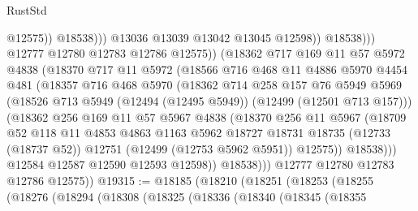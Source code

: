 \begin{lexlean}{RustStd}
\begin{coremodule}
{\begin{coremodule}
{{{{{{{{{{{{{{{{{{{{{{{{{{{{{{{{{{{{{{{{{{{{{{{{{{{{{{{{{{{{{{{{{{{{{{{{{{{{{{{{                                    @12575))
                                @18538)))
                          @13036
                          @13039
                          @13042
                          @13045
                          @12598))
                      @18538)))
                @12777
                @12780
                @12783
                @12786
                @12575))
            (@18362
              @717
              @169
              @11
              @57
              @5972
              @4838
              (@18370
                @717
                @11
                @5972
                (@18566
                  @716
                  @468
                  @11
                  @4886
                  @5970
                  @4454
                  @481
                  (@18357
                    @716
                    @468
                    @5970
                    (@18362
                      @714
                      @258
                      @157
                      @76
                      @5949
                      @5969
                      (@18526 @713 @5949 (@12494 (@12495 @5949)) (@12499 (@12501 @713 @157)))
                      (@18362
                        @256
                        @169
                        @11
                        @57
                        @5967
                        @4838
                        (@18370
                          @256
                          @11
                          @5967
                          (@18709
                            @52
                            @118
                            @11
                            @4853
                            @4863
                            @1163
                            @5962
                            @18727
                            @18731
                            @18735
                            (@12733 (@18737 @52))
                            @12751
                            (@12499 (@12753 @5962 @5951))
                            @12575))
                        @18538)))
                  @12584
                  @12587
                  @12590
                  @12593
                  @12598))
              @18538)))
        @12777
        @12780
        @12783
        @12786
        @12575))
@19315 := @18185
    (@18210
      (@18251
        (@18253
          (@18255
            (@18276
              (@18294
                (@18308
                  (@18325
                    (@18336
                      (@18340
                        (@18345
                          (@18355
}}}}}}}}}}}}}}}}}}}}}}}}}}}}}}}}}}}}}}}}}}}}}}}}}}}}}}}}}}}}}}}}}}}}}}}}}}}}}}}}
\end{coremodule}}
\end{coremodule}
\end{lexlean}

